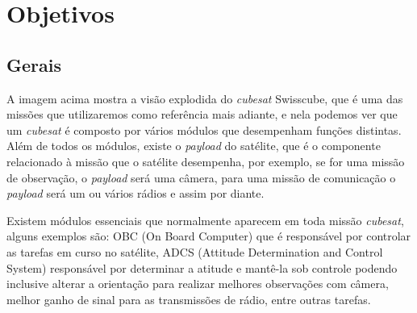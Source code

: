 \section{Objetivos}
\subsection*{Gerais}\label{gerais}

\noindent
\begin{minipage}{\linewidth}
\label{swisscube_exploded_fig}
\end{minipage}

A imagem acima mostra a visão explodida do \textit{cubesat} Swisscube, que é uma das missões que utilizaremos como referência mais adiante, e nela podemos ver que um \textit{cubesat} é composto por vários módulos que desempenham funções distintas. Além de todos os módulos, existe o \textit{payload} do satélite, que é o componente relacionado à missão que o satélite desempenha, por exemplo, se for uma missão de observação, o \textit{payload} será uma câmera, para uma missão de comunicação o \textit{payload} será um ou vários rádios e assim por diante. 

Existem módulos essenciais que normalmente aparecem em toda missão \textit{cubesat}, alguns exemplos são: OBC (On Board Computer) que é responsável por controlar as tarefas em curso no satélite, ADCS (Attitude Determination and Control System) responsável por determinar a atitude e mantê-la sob controle podendo inclusive alterar a orientação para realizar melhores observações com câmera, melhor ganho de sinal para as transmissões de rádio, entre outras tarefas.

